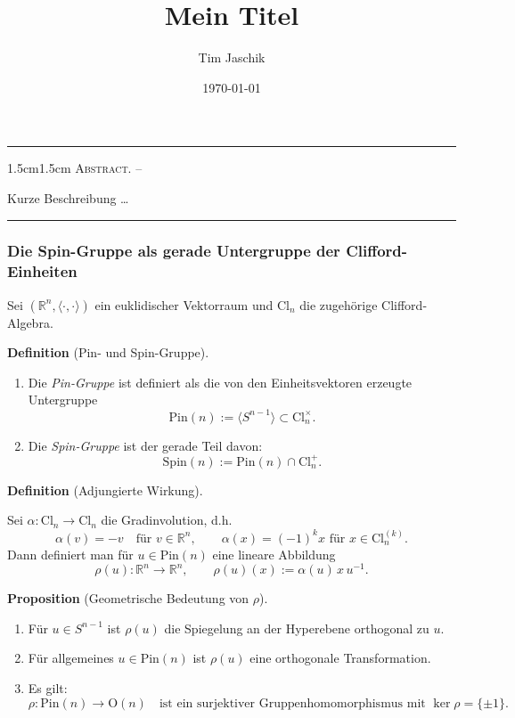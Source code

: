 \documentclass[10pt, letterpaper]{article}
\title{Mein Titel}
\author{Tim Jaschik}
\date{\today}
\newcommand{\R}{\mathbb{R}}
\newcommand{\Cl}{\mathrm{Cl}}
\newcommand{\Spin}{\mathrm{Spin}}
\newcommand{\Pin}{\mathrm{Pin}}
\renewenvironment{abstract}
  {
    \begin{adjustwidth}{1.5cm}{1.5cm}
    \small
    \textsc{Abstract. –}%
  }
  {
    \end{adjustwidth}
  }
\newcommand{\CustomHeading}[3]{%
  \par\medskip\noindent%
  \textbf{#1 #2} \textnormal{(#3)}.\enskip%
}
\newenvironment{DEF}[2]{\CustomHeading{Definition}{#1}{#2}}{}
\newenvironment{PROP}[2]{\CustomHeading{Proposition}{#1}{#2}}{}
\begin{document}
\maketitle
\rule{\textwidth}{0.5pt}
\begin{abstract}
Kurze Beschreibung …
\end{abstract}
\rule{\textwidth}{0.5pt}
\vspace{0.5cm}

\tableofcontents

\pagebreak

\subsubsection{Die Spin-Gruppe als gerade Untergruppe der Clifford-Einheiten}

Sei $(\R^n,\langle\cdot,\cdot\rangle)$ ein euklidischer Vektorraum und 
$\Cl_n$ die zugehörige Clifford-Algebra.

\begin{DEF}{}{Pin- und Spin-Gruppe}
\begin{enumerate}
\item Die \emph{Pin-Gruppe} ist definiert als die von den Einheitsvektoren erzeugte Untergruppe
\[
\Pin(n):=\langle S^{n-1}\rangle \subset \Cl_n^\times.
\]

\item Die \emph{Spin-Gruppe} ist der gerade Teil davon:
\[
\Spin(n):=\Pin(n)\cap \Cl_n^+.
\]
\end{enumerate}
\end{DEF}

\begin{DEF}{}{Adjungierte Wirkung}
Sei $\alpha:\Cl_n\to\Cl_n$ die Gradinvolution, d.h.
\[
\alpha(v)=-v \quad \text{für } v\in \R^n,
\qquad
\alpha(x)=(-1)^k x \text{ für } x\in \Cl_n^{(k)}.
\]
Dann definiert man für $u\in \Pin(n)$ eine lineare Abbildung
\[
\rho(u):\R^n\to \R^n,\qquad
\rho(u)(x):=\alpha(u)\,x\,u^{-1}.
\]
\end{DEF}

\begin{PROP}{}{Geometrische Bedeutung von $\rho$}
\begin{enumerate}
\item Für $u\in S^{n-1}$ ist $\rho(u)$ die Spiegelung an der Hyperebene orthogonal zu $u$.
\item Für allgemeines $u\in \Pin(n)$ ist $\rho(u)$ eine orthogonale Transformation.
\item Es gilt:
\[
\rho:\Pin(n)\to \mathrm{O}(n)
\quad \text{ist ein surjektiver Gruppenhomomorphismus mit } \ker\rho=\{\pm 1\}.
\]
\end{enumerate}
\end{PROP}
\end{document}
